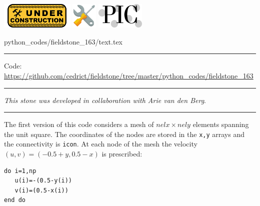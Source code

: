 \noindent
\includegraphics[height=1.25cm]{images/pictograms/under_construction}
\includegraphics[height=1.25cm]{images/pictograms/tools}
\includegraphics[height=1.25cm]{images/pictograms/pic}


\begin{flushright} {\tiny {\color{gray} python\_codes/fieldstone\_163/text.tex}} \end{flushright}

%

\par\noindent\rule{\textwidth}{0.4pt}

\begin{center}
\inpython
{\small Code: \url{https://github.com/cedrict/fieldstone/tree/master/python_codes/fieldstone_163}}
\end{center}

\par\noindent\rule{\textwidth}{0.4pt}

{\sl This stone was developed in collaboration with Arie van den Berg}. 

\par\noindent\rule{\textwidth}{0.4pt}


The first version of this code considers a mesh of $nelx \times nely$ elements spanning the unit square.
The coordinates of the nodes are stored in the \verb|x,y| arrays and the connectivity is \verb|icon|. 
At each node of the mesh the velocity $(u,v)=(-0.5+y,0.5-x)$ is prescribed:
\begin{verbatim}
do i=1,np
   u(i)=-(0.5-y(i))
   v(i)=(0.5-x(i))
end do
\end{verbatim}

